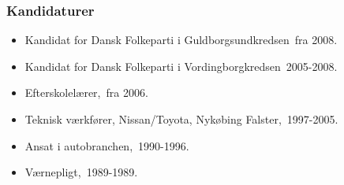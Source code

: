 \documentclass[11pt, a4paper]{awesome-cv}
\begin{document}
\begin{cvletter}
\subsubsection*{Kandidaturer}
\begin{itemize}
\item Kandidat for Dansk Folkeparti i Guldborgsundkredsen fra 2008.
\item Kandidat for Dansk Folkeparti i Vordingborgkredsen 2005-2008.
\end{itemize}
\begin{itemize}
\item Efterskolelærer, fra 2006.
\item Teknisk værkfører, Nissan/Toyota, Nykøbing Falster, 1997-2005.
\item Ansat i autobranchen, 1990-1996.
\item Værnepligt, 1989-1989.
\end{itemize}
\end{cvletter}
\end{document}
